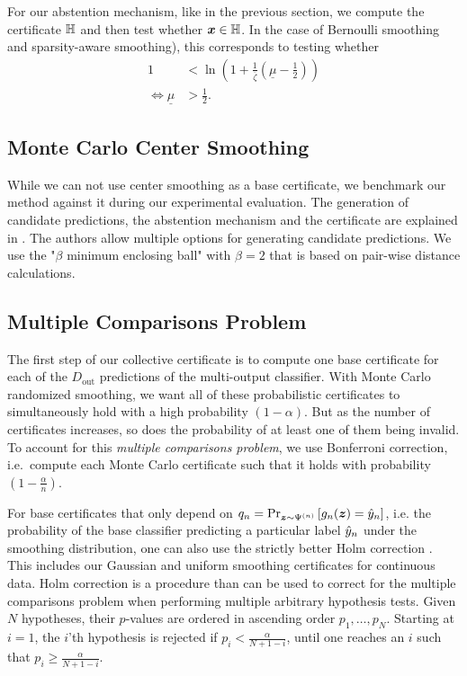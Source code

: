 For our abstention mechanism, like in the previous section, we compute the certificate ${\mathbb{H}}$ and then test whether ${\bm{x}} \in {\mathbb{H}}$. In the case of Bernoulli smoothing and sparsity-aware smoothing), this corresponds to testing whether
\begin{align}
    1 & < \ln\left(1 + \frac{1}{\overline{\zeta}} \left(\underline{\mu} - \frac{1}{2} \right) \right)\\
    \iff
    \underline{\mu} & > \frac{1}{2}.
\end{align}

\subsection{Monte Carlo Center Smoothing}
While we can not use center smoothing as a base certificate, we benchmark our method against it during our experimental evaluation.
The generation of candidate predictions, the abstention mechanism and the certificate are explained in \citep{Kumar2021}.
The authors allow multiple options for generating candidate predictions. We use the "$\beta$ minimum enclosing ball" with $\beta=2$ that is based on pair-wise distance calculations.

\subsection{Multiple Comparisons Problem}\label{section:multiple_comparisons}
The first step of our collective certificate is to compute one base certificate for each of the $D_\mathrm{out}$ predictions of the multi-output classifier.
With Monte Carlo randomized smoothing, we want all of these probabilistic certificates to simultaneously hold with a high probability $(1-\alpha)$.
But as the number of certificates increases, so does the probability of at least one of them being invalid.
To account for this \textit{multiple comparisons problem}, we use Bonferroni \citep{Bonferroni1936} correction, i.e.~compute each Monte Carlo certificate such that it holds with probability $(1 - \frac{\alpha}{n})$.

For base certificates that only depend on $q_n = \Pr_{{\bm{z}} \sim \Psi^{(n)}} \left[g_n({\bm{z}}) = \hat{{y}}_n\right]$, i.e. the probability of the base classifier predicting a particular label $\hat{{y}}_n$ under the smoothing distribution, 
one can also use the strictly better Holm correction \citep{Holm1979}. This includes our Gaussian and uniform smoothing certificates for continuous data.
Holm correction is a procedure than can be used to correct for the multiple comparisons problem when performing multiple arbitrary hypothesis tests.
Given $N$ hypotheses, their $p$-values are ordered in ascending order $p_1, \dots, p_N$.
Starting at $i=1$, the $i$'th hypothesis is rejected if $p_i < \frac{\alpha}{N + 1 - i}$, until one reaches an $i$ such that $p_i \geq \frac{\alpha}{N + 1 - i}$.


